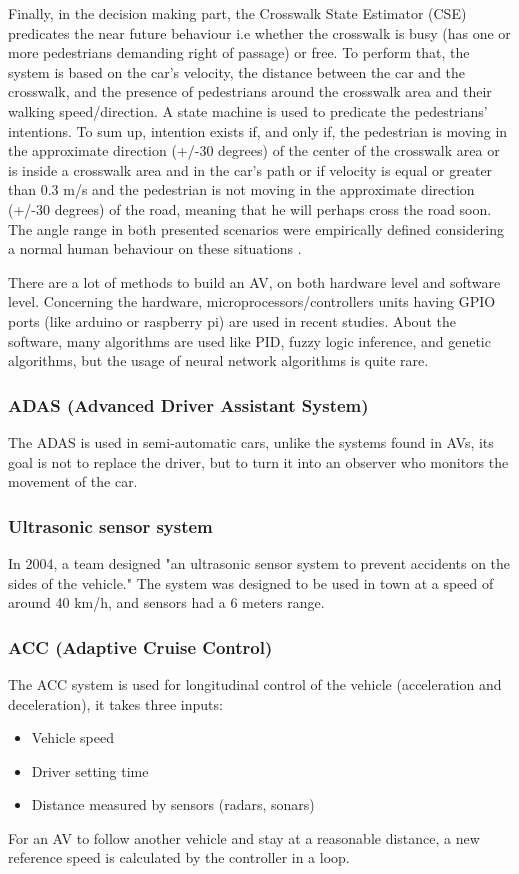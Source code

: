 Finally, in the decision making part, the Crosswalk State Estimator (CSE) predicates the near future behaviour i.e whether the crosswalk is busy (has one or more pedestrians demanding right of passage) or free.
To perform that, the system is based on the car's velocity, the distance between the car and the crosswalk, and the presence of pedestrians around the crosswalk area and their walking speed/direction.
A state machine is used to predicate the pedestrians' intentions. To sum up,  intention exists if, and only if, the pedestrian is moving in the approximate direction (+/-30 degrees) of the center of the crosswalk area or is inside a crosswalk area and in the car’s path or  if velocity is equal or greater than 0.3 m/s and the pedestrian is not moving in the approximate direction (+/-30 degrees) of the road, meaning that he will perhaps cross the road soon. The angle range in both presented scenarios were empirically defined considering a normal human behaviour on these situations \cite{sarcinelli_handling_2019}.

There are a lot of methods to build an AV, on both hardware level and software level. Concerning the hardware, microprocessors/controllers units having GPIO ports (like arduino or raspberry pi) are used in recent studies. About the software, many algorithms are used like PID, fuzzy logic inference, and genetic algorithms, but the usage of neural network algorithms is quite rare.

\subsubsection{ADAS (Advanced Driver Assistant System)}

The ADAS is used in semi-automatic cars, unlike the systems found in AVs, its goal is not to replace the driver, but to turn it into an observer who monitors the movement of the car.

\subsubsection{Ultrasonic sensor system}

In 2004, a team designed "an ultrasonic sensor system to prevent accidents on the sides of the vehicle."\cite{budisusila_review_2019} The system was designed to be used in town at a speed of around 40 km/h, and sensors had a 6 meters range.

\subsubsection{ACC (Adaptive Cruise Control)}

The ACC system is used for longitudinal control of the vehicle (acceleration and deceleration), it takes three inputs:
\begin{itemize}
    \item Vehicle speed
    \item Driver setting time
    \item Distance measured by sensors (radars, sonars)
\end{itemize}
For an AV to follow another vehicle and stay at a reasonable distance, a new reference speed is calculated by the controller in a loop.